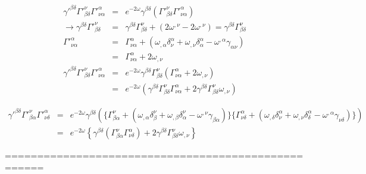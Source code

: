 \documentclass[aps,preprint,preprintnumbers,nofootinbib,showpacs,prd]{revtex4-1}
\newcommand{\nbea}{\begin{eqnarray*}}
\newcommand{\neea}{\end{eqnarray*}}
\begin{document}
%
\nbea
\gamma'^{\beta\delta}  \Gamma'^{\nu}_{\beta\delta}\Gamma'^{\alpha}_{\nu\alpha} & = & e^{-2\omega} \gamma^{\beta\delta} \left ( \Gamma'^{\nu}_{\beta\delta}\Gamma'^{\alpha}_{\nu\alpha} \right ) \\
\rightarrow \gamma^{\beta\delta} \Gamma'^{\nu}_{\beta\delta} & = & \gamma^{\beta\delta}\Gamma^\nu_{\beta\delta} + \left ( 2\omega^{,\nu} - 2 \omega^{,\nu} \right ) = \gamma^{\beta\delta}\Gamma^\nu_{\beta\delta}  \\
\Gamma'^{\alpha}_{\nu\alpha} & = & \Gamma^\alpha_{\nu\alpha} + \left ( \omega_{,\alpha}\delta^\alpha_\nu +\omega_{,\nu} \delta^\alpha_\alpha - \omega^{,\alpha} \gamma_{\alpha\nu} \right ) \\
& = & \Gamma^\alpha_{\nu\alpha} + 2 \omega_{,\nu} \\
\gamma'^{\beta\delta}  \Gamma'^{\nu}_{\beta\delta}\Gamma'^{\alpha}_{\nu\alpha} & = & e^{-2\omega} \gamma^{\beta\delta}\Gamma^\nu_{\beta\delta} (\Gamma^\alpha_{\nu\alpha} + 2 \omega_{,\nu}) \\
& = & e^{-2\omega} (\gamma^{\beta\delta}\Gamma^\nu_{\beta\delta} \Gamma^\alpha_{\nu\alpha} + 2 \gamma^{\beta\delta}\Gamma^\nu_{\beta\delta}\omega_{,\nu})
\neea
%

%
\nbea
\gamma'^{\beta\delta}\Gamma'^{\nu}_{\beta\alpha}\Gamma'^{\alpha}_{\nu\delta} & = & e^{-2\omega} \gamma^{\beta\delta} \left ( \{ \Gamma^\nu_{\beta\alpha} + \left ( \omega_{,\alpha}\delta^\nu_\beta + \omega_{,\beta} \delta^\nu_\alpha - \omega^{,\nu} \gamma_{\beta\alpha} \right )  \} \{\Gamma^\alpha_{\nu\delta} + \left ( \omega_{,\delta} \delta^\alpha_\nu + \omega_{,\nu}\delta^\alpha_\delta - \omega^{,\alpha} \gamma_{\nu\delta} \right ) \} \right ) \\
& = & e^{-2\omega} \left \{ \gamma^{\beta\delta} \left ( \Gamma^\nu_{\beta\alpha} \Gamma^\alpha_{\nu\delta}  \right )  + 2 \gamma^{\beta\delta} \Gamma^\nu_{\beta\delta} \omega_{,\nu} \right \}
\neea
%










====================================================
\end{document}

